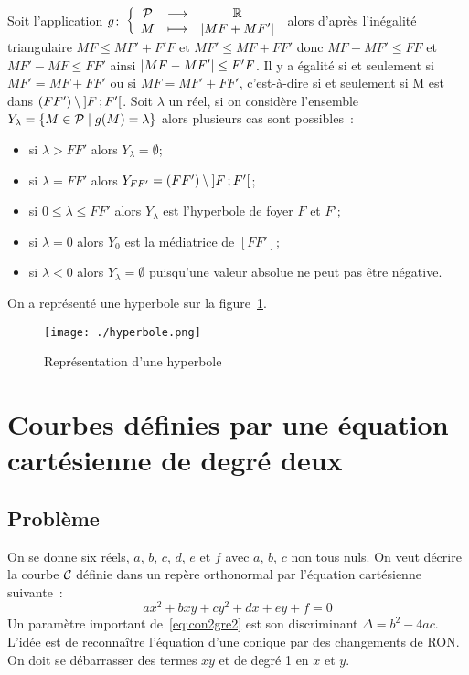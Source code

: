 Soit l'application $g\colon \left\{\begin{array}{ccc} \mathcal{P} & \longrightarrow &\mathbb{R}\\ M & \longmapsto & \left\lvert MF+MF'\right\rvert \end{array} \right.$ alors d'après l'inégalité triangulaire $MF \leq MF'+F'F$ et $MF'\leq MF+FF'$ donc $MF-MF'\leq FF$ et $MF'-MF\leq FF'$ ainsi $\left\lvert MF-MF'\right\rvert\leq F'F$. Il y a égalité si et seulement si $MF'=MF+FF'$ ou si $MF=MF'+FF'$, c'est-à-dire si et seulement si M est dans $(FF') \setminus \left] F \, ;  F' \right[$. Soit $\lambda$ un réel, si on considère l'ensemble $Y_{\lambda}=\left\{M \in \mathcal{P}\mathrel{}\middle|\mathrel{}g(M)=\lambda\right\}$ alors plusieurs cas sont possibles~:
\begin{itemize}
\item si $\lambda>FF'$ alors $Y_{\lambda}=\emptyset$;
\item si $\lambda=FF'$ alors $Y_{FF'}=(FF') \setminus \left] F \, ;  F' \right[$;
\item si $0\leq\lambda\leq FF'$ alors $Y_{\lambda}$ est l'hyperbole de foyer $F$ et $F'$;
\item si $\lambda=0$ alors $Y_{0}$ est la médiatrice de $[FF']$;
\item si $\lambda<0$ alors $Y_{\lambda}=\emptyset$ puisqu'une valeur absolue ne peut pas être négative.
\end{itemize}

On a représenté une hyperbole sur la figure~\ref{fig:hyperbole}.

\begin{figure}[!h]
  \centering
  \texttt{[image: ./hyperbole.png]}
  \caption{Représentation d'une hyperbole}
  \label{fig:hyperbole}
\end{figure}


\section{Courbes définies par une équation cartésienne de degré deux}
\label{sec:eqcart}
\subsection{Problème}
On se donne six réels, $a$, $b$, $c$, $d$, $e$ et $f$ avec $a$, $b$, $c$ non tous nuls. On veut décrire la courbe $\mathcal{C}_{{}}$ définie dans un repère orthonormal par l'équation cartésienne suivante~:
\begin{equation}
  ax^2+bxy+cy^2+dx+ey+f=0 \label{eq:con2gre2}
\end{equation}
Un paramètre important de~\eqref{eq:con2gre2} est son discriminant $\Delta=b^2-4ac$. L'idée est de reconnaître l'équation d'une conique par des changements de RON\@. On doit se débarrasser des termes $xy$ et de degré 1 en $x$ et $y$.

